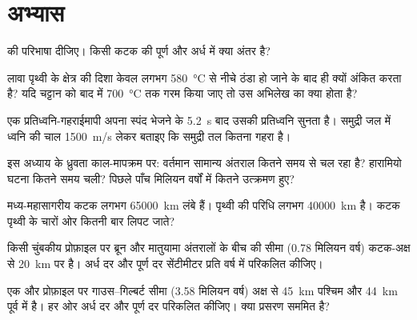 \section{अभ्यास}

\begin{exercise}[$\star$]\label{exo:g11:drift-to-spreading:1}
 की परिभाषा दीजिए। किसी कटक की पूर्ण और
अर्ध  में क्या अंतर है?
\end{exercise}

\begin{exercise}[$\star$]\label{exo:g11:drift-to-spreading:2}
लावा पृथ्वी के क्षेत्र की दिशा केवल लगभग \qty{580}{\celsius} से नीचे ठंडा हो जाने के बाद ही
क्यों अंकित करता है? यदि चट्टान को बाद में \qty{700}{\celsius} तक गरम किया जाए
तो उस अभिलेख का क्या होता है?
\end{exercise}

\begin{exercise}[$\star$]\label{exo:g11:drift-to-spreading:3}
एक प्रतिध्वनि-गहराईमापी अपना स्पंद भेजने के \qty{5.2}{s} बाद उसकी प्रतिध्वनि सुनता है।
समुद्री जल में ध्वनि की चाल \qty{1500}{m/s} लेकर बताइए कि समुद्री तल
कितना गहरा है।
\end{exercise}

\begin{exercise}[$\star$]\label{exo:g11:drift-to-spreading:4}
इस अध्याय के ध्रुवता काल-मापक्रम पर: वर्तमान सामान्य
अंतराल कितने समय से चल रहा है? हारामियो घटना कितने समय चली? पिछले पाँच मिलियन वर्षों में
कितने उत्क्रमण हुए?
\end{exercise}

\begin{exercise}[$\star$]\label{exo:g11:drift-to-spreading:5}
मध्य-महासागरीय कटक लगभग \qty{65000}{km} लंबे हैं। पृथ्वी की परिधि
लगभग \qty{40000}{km} है। कटक पृथ्वी के चारों ओर कितनी बार
लिपट जाते?
\end{exercise}

\begin{exercise}[$\star\star$]\label{exo:g11:drift-to-spreading:6}
किसी चुंबकीय प्रोफ़ाइल पर ब्रून और मातुयामा अंतरालों के बीच की सीमा
(\num{0.78} मिलियन वर्ष) कटक-अक्ष से \qty{20}{km} पर है। अर्ध दर और पूर्ण दर
सेंटीमीटर प्रति वर्ष में परिकलित कीजिए।
\end{exercise}

\begin{exercise}[$\star\star$]\label{exo:g11:drift-to-spreading:7}
एक और प्रोफ़ाइल पर गाउस--गिल्बर्ट सीमा (\num{3.58} मिलियन वर्ष)
अक्ष से \qty{45}{km} पश्चिम और \qty{44}{km} पूर्व में है। हर ओर अर्ध दर
और पूर्ण दर परिकलित कीजिए। क्या प्रसरण सममित है?
\end{exercise}

